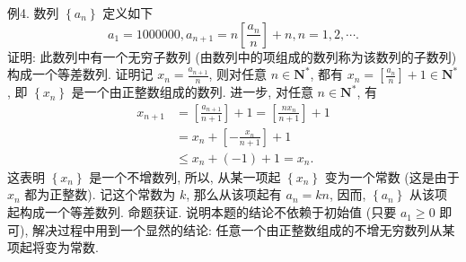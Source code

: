 例4. 数列 $\left\{a_n\right\}$ 定义如下
$$
a_1=1000000, a_{n+1}=n\left[\frac{a_n}{n}\right]+n, n=1,2, \cdots .
$$
证明: 此数列中有一个无穷子数列 (由数列中的项组成的数列称为该数列的子数列)构成一个等差数列.
证明记 $x_n=\frac{a_{n+1}}{n}$, 则对任意 $n \in \mathbf{N}^*$, 都有 $x_n=\left[\frac{a_n}{n}\right]+1 \in \mathbf{N}^*$, 即 $\left\{x_n\right\}$ 是一个由正整数组成的数列.
进一步, 对任意 $n \in \mathbf{N}^*$, 有
$$
\begin{aligned}
x_{n+1} & =\left[\frac{a_{n+1}}{n+1}\right]+1=\left[\frac{n x_n}{n+1}\right]+1 \\
& =x_n+\left[-\frac{x_n}{n+1}\right]+1 \\
& \leqslant x_n+(-1)+1=x_n .
\end{aligned}
$$
这表明 $\left\{x_n\right\}$ 是一个不增数列, 所以, 从某一项起 $\left\{x_n\right\}$ 变为一个常数 (这是由于 $x_n$ 都为正整数). 记这个常数为 $k$, 那么从该项起有 $a_n=k n$, 因而, $\left\{a_n\right\}$ 从该项起构成一个等差数列.
命题获证.
说明本题的结论不依赖于初始值 (只要 $a_1 \geqslant 0$ 即可), 解决过程中用到一个显然的结论: 任意一个由正整数组成的不增无穷数列从某项起将变为常数.



